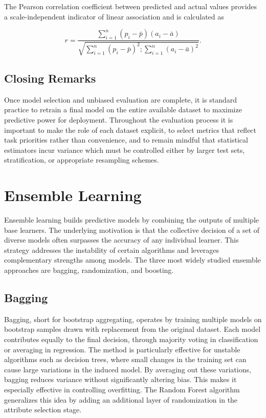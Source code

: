 The Pearson correlation coefficient between predicted and actual values provides a scale-independent indicator of linear association and is calculated as

\begin{equation}
r = \frac{\sum_{i=1}^n (p_i - \bar{p})(a_i - \bar{a})}{\sqrt{\sum_{i=1}^n (p_i - \bar{p})^2 ; \sum_{i=1}^n (a_i - \bar{a})^2}}.
\end{equation}

\subsection{Closing Remarks}

Once model selection and unbiased evaluation are complete, it is standard practice to retrain a final model on the entire available dataset to maximize predictive power for deployment. Throughout the evaluation process it is important to make the role of each dataset explicit, to select metrics that reflect task priorities rather than convenience, and to remain mindful that statistical estimators incur variance which must be controlled either by larger test sets, stratification, or appropriate resampling schemes.

\section{Ensemble Learning}
Ensemble learning builds predictive models by combining the outputs of multiple base learners. The underlying motivation is that the collective decision of a set of diverse models often surpasses the accuracy of any individual learner. This strategy addresses the instability of certain algorithms and leverages complementary strengths among models. The three most widely studied ensemble approaches are bagging, randomization, and boosting.

\subsection{Bagging}

Bagging, short for bootstrap aggregating, operates by training multiple models on bootstrap samples drawn with replacement from the original dataset. Each model contributes equally to the final decision, through majority voting in classification or averaging in regression. The method is particularly effective for unstable algorithms such as decision trees, where small changes in the training set can cause large variations in the induced model. By averaging out these variations, bagging reduces variance without significantly altering bias. This makes it especially effective in controlling overfitting. The Random Forest algorithm generalizes this idea by adding an additional layer of randomization in the attribute selection stage.

